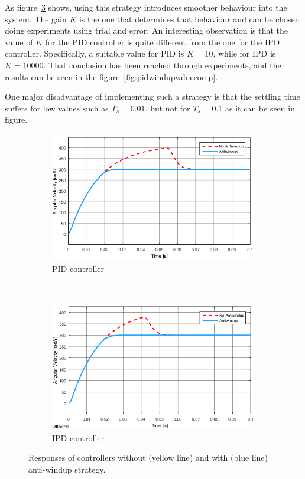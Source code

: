 As figure~\ref{fig:antiwindupresponses} shows, using this strategy introduces smoother behaviour into the system. The gain $K$ is the one that determines that behaviour and can be chosen doing experiments using trial and error. An interesting observation is that the value of $K$ for the PID controller is quite different from the one for the IPD controller. Specifically, a suitable value for PID is $K=10$, while for IPD is $K=10000$. That conclusion has been reached through experiments, and the results can be seen in the figure~\ref{fig:pidwindupvaluecomp}.

One major disadvantage of implementing such a strategy is that the settling time suffers for low values such as $T_s=0.01$, but not for $T_s=0.1$ as it can be seen in figure. 
\begin{figure}
	\centering
	\begin{subfigure}[b]{0.45\textwidth}
		\includegraphics[width=\textwidth]{graphics/pidwindupresponse}
		\caption{PID controller}
		\label{fig:pidwindupresponse}
	\end{subfigure}
	~ %
	\begin{subfigure}[b]{0.45\textwidth}
		\includegraphics[width=\textwidth]{graphics/ipdwindupresponse}
		\caption{IPD controller}
		\label{fig:ipdwindupresponse}
	\end{subfigure}
	\caption{Responses of controllers without (yellow line) and with (blue line) anti-windup strategy.}\label{fig:antiwindupresponses}
\end{figure}


